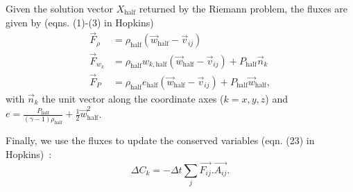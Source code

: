 Given the solution vector $X_\text{half}$ returned by the Riemann problem, the fluxes are given by (eqns. (1)-(3) in Hopkins)
\begin{align}
	\vec{F}_\rho &= 
		\rho_\text{half} \left( \vec{w}_\text{half} - \vec{v}_{ij}\right)\\
	\vec{F}_{w_k} &= 
		\rho_\text{half} w_{k, \text{half}} \left( \vec{w}_\text{half} - \vec{v}_{ij} \right) + P_\text{half} \vec{n}_k\\
	\vec{F}_P &= 
		\rho_\text{half} e_\text{half} \left( \vec{w}_\text{half} - \vec{v}_{ij}\right) + P_\text{half} \vec{w}_\text{half},
\end{align}
with $\vec{n}_k$ the unit vector along the coordinate axes ($k=x,y,z$) and $e = \frac{P_\text{half}}{\left(\gamma -1\right)\rho_\text{half}} + \frac{1}{2}\vec{w}_\text{half}^2$.

Finally, we use the fluxes to update the conserved variables (eqn. (23) in Hopkins)~:
\begin{equation}
	\Delta C_k = -\Delta t \sum_j \vec{F_{ij}}.\vec{A_{ij}}.
\end{equation}